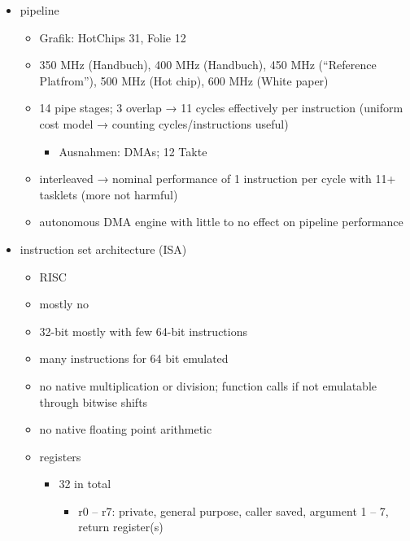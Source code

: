 \begin{itemize}
	\item
	pipeline
	\begin{itemize}
		\item
		Grafik:
		HotChips 31, Folie 12

		\item
		350 MHz (Handbuch), 400 MHz (Handbuch), 450 MHz (\enquote{Reference Platfrom}), 500 MHz (Hot chip), 600 MHz (White paper)

		\item
		14 pipe stages; 3 overlap → 11 cycles effectively per instruction (uniform cost model → counting cycles/instructions useful)
		\begin{itemize}
			\item
			Ausnahmen:
			DMAs;
			12 Takte
		\end{itemize}

		\item
		interleaved → nominal performance of 1 instruction per cycle with 11+ tasklets (more not harmful)

		\item
		autonomous DMA engine with little to no effect on pipeline performance
	\end{itemize}

	\item
	instruction set architecture (ISA)
	\begin{itemize}
		\item
		RISC

		\item
		mostly no

		\item
		32-bit mostly with few 64-bit instructions

		\item
		many instructions for 64 bit emulated

		\item
		no native multiplication or division;
		function calls if not emulatable through bitwise shifts

		\item
		no native floating point arithmetic

		\item
		registers
		\begin{itemize}
			\item
			32 in total
			\begin{itemize}
				\item
				r0 -- r7:
				private,
				general purpose,
				caller saved,
				argument 1 -- 7,
				return register(s)


\end{itemize}
\end{itemize}
\end{itemize}
\end{itemize}

